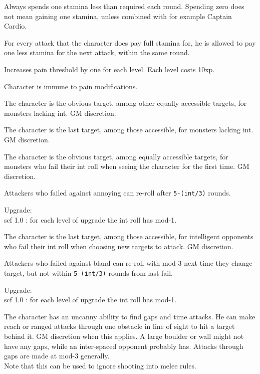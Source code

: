  Always spends one stamina less than required each round. Spending zero does not mean gaining one stamina, unless combined with for example Captain Cardio.


 For every attack that the character does pay full stamina for, he is allowed to pay one less stamina for the next attack, within the same round.


 Increases pain threshold by one for each level. Each level costs 10xp.


 Character is immune to pain modifications.


 The character is the obvious target, among other equally accessible targets, for monsters lacking int. GM discretion.


 The character is the last target, among those accessible, for monsters lacking int. GM discretion.


 The character is the obvious target, among equally accessible targets, for monsters who fail their int roll when seeing the character for the first time. GM discretion.

Attackers who failed against annoying can re-roll after \verb|5-(int/3)| rounds.

Upgrade:\\
scf 1.0 : for each level of upgrade the int roll has mod-1.


  The character is the last target, among those accessible, for intelligent opponents who fail their int roll when choosing new targets to attack. GM discretion.

Attackers who failed against bland can re-roll with mod-3 next time they change target, but not within \verb|5-(int/3)| rounds from last fail.

Upgrade:\\
scf 1.0 : for each level of upgrade the int roll has mod-1.


 The character has an uncanny ability to find gaps and time attacks. He can make reach or ranged attacks through one obstacle in line of sight to hit a target behind it. GM discretion when this applies. A large boulder or wall might not have any gaps, while an inter-spaced opponent probably has. Attacks through gaps are made at mod-3 generally. \\
Note that this can be used to ignore shooting into melee rules.

